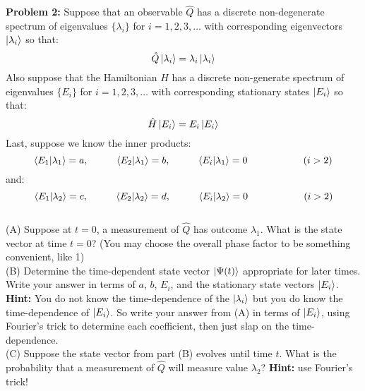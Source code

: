 \documentclass[12pt]{article}
\begin{document}
\noindent
{\bf Problem 2:}  Suppose that an observable $\hat{Q}$ has a discrete non-degenerate spectrum of eigenvalues $\{ \lambda_i \}$ for $i=1,2,3,\ldots$ with corresponding eigenvectors $\ket{\lambda_i}$ so that:
$$\hat{Q} \ket{\lambda_i} = \lambda_i \ket{\lambda_i}$$
Also suppose that the Hamiltonian $\hat{H}$ has a discrete non-generate spectrum of eigenvalues 
$\{ E_i \}$ for $i=1,2,3,\ldots$ with corresponding stationary states $\ket{E_i}$ so that:
$$\hat{H} \ket{E_i} = E_i \ket{E_i}$$
Last, suppose we know the inner products:
$$\braket{E_1|\lambda_1} = a, \hspace{1cm} \braket{E_2|\lambda_1} = b, \hspace{1cm} \braket{E_i|\lambda_1} = 0 \hspace{2cm} (i>2) $$ 
and:
$$\braket{E_1|\lambda_2} = c, \hspace{1cm} \braket{E_2|\lambda_2} = d, \hspace{1cm} \braket{E_i|\lambda_2} = 0 \hspace{2cm} (i>2) $$ 
\\[2pt]
\noindent
(A) Suppose at $t=0$, a measurement of $\hat{Q}$ has outcome $\lambda_1$.  What is the state vector at time $t=0$? (You may choose the overall phase factor to be something convenient, like 1) \\[8 pt]
\noindent
(B) Determine the time-dependent state vector $\ket{\Psi(t)}$ appropriate for later times.  Write your answer in terms of $a$, $b$, $E_i$, and the stationary state vectors $\ket{E_i}$. {\bf Hint:} You do not know the time-dependence of the $\ket{\lambda_i}$ but you do know the time-dependence of $\ket{E_i}$.  So write your answer from (A) in terms of $\ket{E_i}$, using Fourier's trick to determine each coefficient, then just slap on the time-dependence.\\[8pt]
\noindent
(C) Suppose the state vector from part (B) evolves until time $t$.  What is the probability that a measurement of $\hat{Q}$ will measure value $\lambda_2$? {\bf Hint:} use Fourier's trick!\\[8pt]
\end{document}
